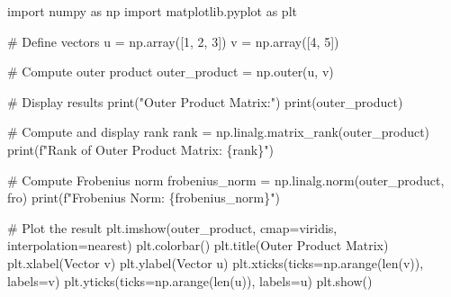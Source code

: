 \documentclass[
  letterpaper,
  DIV=11,
  numbers=noendperiod]{scrreprt}
\newenvironment{Shaded}{\begin{snugshade}}{\end{snugshade}}
\newcommand{\BuiltInTok}[1]{\textcolor[rgb]{0.00,0.23,0.31}{#1}}
\newcommand{\CommentTok}[1]{\textcolor[rgb]{0.37,0.37,0.37}{#1}}
\newcommand{\DecValTok}[1]{\textcolor[rgb]{0.68,0.00,0.00}{#1}}
\newcommand{\ImportTok}[1]{\textcolor[rgb]{0.00,0.46,0.62}{#1}}
\newcommand{\NormalTok}[1]{\textcolor[rgb]{0.00,0.23,0.31}{#1}}
\newcommand{\OperatorTok}[1]{\textcolor[rgb]{0.37,0.37,0.37}{#1}}
\newcommand{\SpecialCharTok}[1]{\textcolor[rgb]{0.37,0.37,0.37}{#1}}
\newcommand{\SpecialStringTok}[1]{\textcolor[rgb]{0.13,0.47,0.30}{#1}}
\newcommand{\StringTok}[1]{\textcolor[rgb]{0.13,0.47,0.30}{#1}}
\theoremstyle{plain}
\theoremstyle{definition}
\theoremstyle{remark}
\begin{document}
\begin{Shaded}
\begin{Highlighting}[]
\ImportTok{import}\NormalTok{ numpy }\ImportTok{as}\NormalTok{ np}
\ImportTok{import}\NormalTok{ matplotlib.pyplot }\ImportTok{as}\NormalTok{ plt}

\CommentTok{\# Define vectors}
\NormalTok{u }\OperatorTok{=}\NormalTok{ np.array([}\DecValTok{1}\NormalTok{, }\DecValTok{2}\NormalTok{, }\DecValTok{3}\NormalTok{])}
\NormalTok{v }\OperatorTok{=}\NormalTok{ np.array([}\DecValTok{4}\NormalTok{, }\DecValTok{5}\NormalTok{])}

\CommentTok{\# Compute outer product}
\NormalTok{outer\_product }\OperatorTok{=}\NormalTok{ np.outer(u, v)}

\CommentTok{\# Display results}
\BuiltInTok{print}\NormalTok{(}\StringTok{"Outer Product Matrix:"}\NormalTok{)}
\BuiltInTok{print}\NormalTok{(outer\_product)}

\CommentTok{\# Compute and display rank}
\NormalTok{rank }\OperatorTok{=}\NormalTok{ np.linalg.matrix\_rank(outer\_product)}
\BuiltInTok{print}\NormalTok{(}\SpecialStringTok{f"Rank of Outer Product Matrix: }\SpecialCharTok{\{}\NormalTok{rank}\SpecialCharTok{\}}\SpecialStringTok{"}\NormalTok{)}

\CommentTok{\# Compute Frobenius norm}
\NormalTok{frobenius\_norm }\OperatorTok{=}\NormalTok{ np.linalg.norm(outer\_product, }\StringTok{\textquotesingle{}fro\textquotesingle{}}\NormalTok{)}
\BuiltInTok{print}\NormalTok{(}\SpecialStringTok{f"Frobenius Norm: }\SpecialCharTok{\{}\NormalTok{frobenius\_norm}\SpecialCharTok{\}}\SpecialStringTok{"}\NormalTok{)}

\CommentTok{\# Plot the result}
\NormalTok{plt.imshow(outer\_product, cmap}\OperatorTok{=}\StringTok{\textquotesingle{}viridis\textquotesingle{}}\NormalTok{, interpolation}\OperatorTok{=}\StringTok{\textquotesingle{}nearest\textquotesingle{}}\NormalTok{)}
\NormalTok{plt.colorbar()}
\NormalTok{plt.title(}\StringTok{\textquotesingle{}Outer Product Matrix\textquotesingle{}}\NormalTok{)}
\NormalTok{plt.xlabel(}\StringTok{\textquotesingle{}Vector v\textquotesingle{}}\NormalTok{)}
\NormalTok{plt.ylabel(}\StringTok{\textquotesingle{}Vector u\textquotesingle{}}\NormalTok{)}
\NormalTok{plt.xticks(ticks}\OperatorTok{=}\NormalTok{np.arange(}\BuiltInTok{len}\NormalTok{(v)), labels}\OperatorTok{=}\NormalTok{v)}
\NormalTok{plt.yticks(ticks}\OperatorTok{=}\NormalTok{np.arange(}\BuiltInTok{len}\NormalTok{(u)), labels}\OperatorTok{=}\NormalTok{u)}
\NormalTok{plt.show()}
\end{Highlighting}
\end{Shaded}
\end{document}
